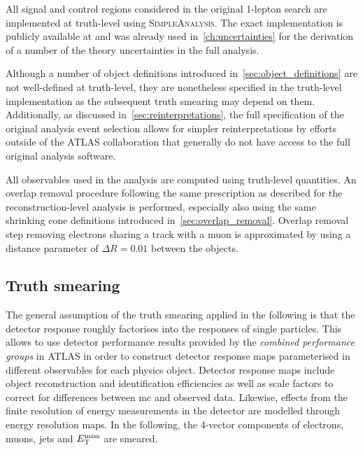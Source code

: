 All signal and control regions considered in the original 1-lepton search are implemented at truth-level using \textsc{SimpleAnalysis}. The exact implementation is publicly available at \cite{HEPdata_1Lbb} and was already used in~\cref{ch:uncertainties} for the derivation of a number of the theory uncertainties in the full analysis.

Although a number of object definitions introduced in~\cref{sec:object_definitions} are not well-defined at truth-level, they are nonetheless specified in the truth-level implementation as the subsequent truth smearing may depend on them. Additionally, as discussed in~\cref{sec:reinterpretations}, the full specification of the original analysis event selection allows for simpler reinterpretations by efforts outside of the ATLAS collaboration that generally do not have access to the full original analysis software.

All observables used in the analysis are computed using truth-level quantities. An overlap removal procedure following the same prescription as described for the reconstruction-level analysis is performed, \ie especially also using the same shrinking cone definitions introduced in~\cref{sec:overlap_removal}. Overlap removal step removing electrons sharing a track with a muon is approximated by using a distance parameter of $\Delta R = 0.01$ between the objects. 

\subsection{Truth smearing}\label{sec:truth_smearing}

The general assumption of the truth smearing applied in the following is that the detector response roughly factorises into the responses of single particles. This allows to use detector performance results provided by the \textit{combined performance groups} in ATLAS in order to construct detector response maps parameterised in different observables for each physics object. Detector response maps include object reconstruction and identification efficiencies as well as scale factors to correct for differences between \gls{mc} and observed data. Likewise, effects from the finite resolution of energy measurements in the detector are modelled through energy resolution maps. In the following, the 4-vector components of electrons, muons, jets and $E_{\textrm{T}}^{\textrm{miss}}$ are smeared.

